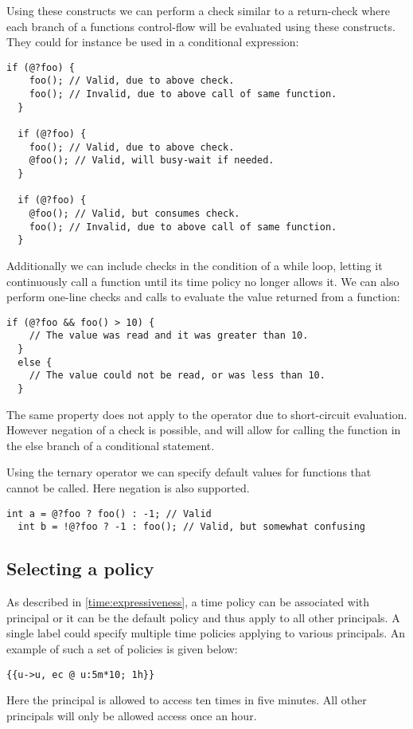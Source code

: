 Using these constructs we can perform a check similar to a return-check where each branch of a functions control-flow will be evaluated using these constructs.
They could for instance be used in a conditional expression:
\begin{lstlisting}[style=dlmc]
  if (@?foo) {
    foo(); // Valid, due to above check.
    foo(); // Invalid, due to above call of same function.
  }

  if (@?foo) {
    foo(); // Valid, due to above check.
    @foo(); // Valid, will busy-wait if needed.
  }

  if (@?foo) {
    @foo(); // Valid, but consumes check.
    foo(); // Invalid, due to above call of same function.
  }
\end{lstlisting}
Additionally we can include checks in the condition of a while loop, letting it continuously call a function until its time policy no longer allows it.
We can also perform one-line checks and calls to evaluate the value returned from a function:
\begin{lstlisting}[style=dlmc]
  if (@?foo && foo() > 10) {
    // The value was read and it was greater than 10.
  }
  else {
    // The value could not be read, or was less than 10.
  }
\end{lstlisting}
The same property does not apply to the \dlmc{||} operator due to short-circuit evaluation.
However negation of a  check is possible, and will allow for calling the function in the else branch of a conditional statement.

Using the ternary operator we can specify default values for functions that cannot be called.
Here negation is also supported.

\begin{lstlisting}[style=dlmc]
  int a = @?foo ? foo() : -1; // Valid
  int b = !@?foo ? -1 : foo(); // Valid, but somewhat confusing
\end{lstlisting}

\subsection{Selecting a policy}\label{time:authority}
As described in \cref{time:expressiveness}, a time policy can be associated with principal or it can be the default policy and thus apply to all other principals.
A single label could specify multiple time policies applying to various principals.
An example of such a set of policies is given below:
\begin{lstlisting}[style=dlmc]
  {{u->u, ec @ u:5m*10; 1h}}
\end{lstlisting}
Here the principal  is allowed to access ten times in five minutes.
All other principals will only be allowed access once an hour.

